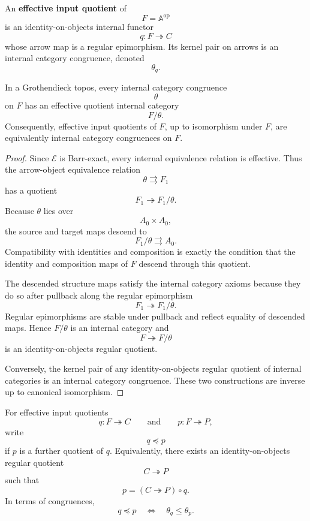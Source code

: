 \begin{definition}
\label{def:reiterman-effective-input-quotient}
An \textbf{effective input quotient} of
\[
F=\mathbb A^{\mathrm{op}}
\]
is an identity-on-objects internal functor
\[
q:F\twoheadrightarrow C
\]
whose arrow map is a regular epimorphism. Its kernel pair on arrows is an
internal category congruence, denoted
\[
\theta_q.
\]
\end{definition}

\begin{proposition}
\label{prop:reiterman-congruences-effective-quotients}
In a Grothendieck topos, every internal category congruence
\[
\theta
\]
on \(F\) has an effective quotient internal category
\[
F/\theta.
\]
Consequently, effective input quotients of \(F\), up to isomorphism under
\(F\), are equivalently internal category congruences on \(F\).
\end{proposition}

\begin{proof}
Since \(\mathcal E\) is Barr-exact, every internal equivalence relation is
effective. Thus the arrow-object equivalence relation
\[
\theta\rightrightarrows F_1
\]
has a quotient
\[
F_1\twoheadrightarrow F_1/\theta.
\]
Because \(\theta\) lies over
\[
A_0\times A_0,
\]
the source and target maps descend to
\[
F_1/\theta\rightrightarrows A_0.
\]
Compatibility with identities and composition is exactly the condition that
the identity and composition maps of \(F\) descend through this quotient.

The descended structure maps satisfy the internal category axioms because
they do so after pullback along the regular epimorphism
\[
F_1\twoheadrightarrow F_1/\theta.
\]
Regular epimorphisms are stable under pullback and reflect equality of
descended maps. Hence \(F/\theta\) is an internal category and
\[
F\twoheadrightarrow F/\theta
\]
is an identity-on-objects regular quotient.

Conversely, the kernel pair of any identity-on-objects regular quotient of
internal categories is an internal category congruence. These two
constructions are inverse up to canonical isomorphism.
\end{proof}

\begin{definition}
\label{def:reiterman-quotient-order}
For effective input quotients
\[
q:F\twoheadrightarrow C
\qquad\text{and}\qquad
p:F\twoheadrightarrow P,
\]
write
\[
q\preceq p
\]
if \(p\) is a further quotient of \(q\). Equivalently, there exists an
identity-on-objects regular quotient
\[
C\twoheadrightarrow P
\]
such that
\[
p=(C\twoheadrightarrow P)\circ q.
\]
In terms of congruences,
\[
q\preceq p
\quad\Longleftrightarrow\quad
\theta_q\leq\theta_p.
\]
\end{definition}

